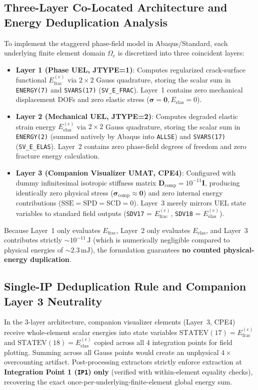 \subsection{Three-Layer Co-Located Architecture and Energy Deduplication Analysis}
To implement the staggered phase-field model in Abaqus/Standard, each underlying finite element domain $\Omega_e$ is discretized into three coincident layers:
\begin{itemize}
  \item \textbf{Layer 1 (Phase UEL, JTYPE=1)}: Computes regularized crack-surface functional $E_{\mathrm{frac}}^{(e)}$ via $2\times 2$ Gauss quadrature, storing the scalar sum in \texttt{ENERGY(7)} and \texttt{SVARS(17)} (\texttt{SV\_E\_FRAC}). Layer~1 contains zero mechanical displacement DOFs and zero elastic stress ($\boldsymbol{\sigma} = \mathbf{0}, E_{\mathrm{elas}} = 0$).
  \item \textbf{Layer 2 (Mechanical UEL, JTYPE=2)}: Computes degraded elastic strain energy $E_{\mathrm{elas}}^{(e)}$ via $2\times 2$ Gauss quadrature, storing the scalar sum in \texttt{ENERGY(2)} (summed natively by Abaqus into \texttt{ALLSE}) and \texttt{SVARS(17)} (\texttt{SV\_E\_ELAS}). Layer~2 contains zero phase-field degrees of freedom and zero fracture energy calculation.
  \item \textbf{Layer 3 (Companion Visualizer UMAT, CPE4)}: Configured with dummy infinitesimal isotropic stiffness matrix $\mathbf{D}_{\mathrm{comp}} = 10^{-11} \mathbf{I}$, producing identically zero physical stress ($\boldsymbol{\sigma}_{\mathrm{comp}} \approx \mathbf{0}$) and zero internal energy contributions ($\text{SSE} = \text{SPD} = \text{SCD} = 0$). Layer~3 merely mirrors UEL state variables to standard field outputs (\texttt{SDV17} = $E_{\mathrm{frac}}^{(e)}$, \texttt{SDV18} = $E_{\mathrm{elas}}^{(e)}$).
\end{itemize}
Because Layer~1 only evaluates $E_{\mathrm{frac}}$, Layer~2 only evaluates $E_{\mathrm{elas}}$, and Layer~3 contributes strictly $\sim 10^{-11}\,\mathrm{J}$ (which is numerically negligible compared to physical energies of $\sim 2.3\,\mathrm{mJ}$), the formulation guarantees \textbf{no counted physical-energy duplication}.

\subsection{Single-IP Deduplication Rule and Companion Layer 3 Neutrality}
In the 3-layer architecture, companion visualizer elements (Layer~3, CPE4) receive whole-element scalar energies into state variables $\mathrm{STATEV}(17) = E_{\mathrm{frac}}^{(e)}$ and $\mathrm{STATEV}(18) = E_{\mathrm{elas}}^{(e)}$ copied across all 4 integration points for field plotting. Summing across all Gauss points would create an unphysical $4\times$ overcounting artifact. Post-processing extractors strictly enforce extraction at \textbf{Integration Point 1 (\texttt{IP1}) only} (verified with within-element equality checks), recovering the exact once-per-underlying-finite-element global energy sum. 


